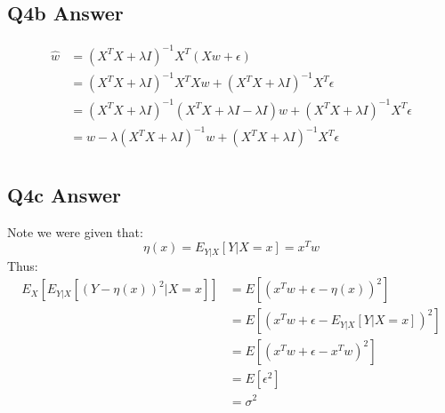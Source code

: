 \documentclass{article}
\newcommand{\1}{\mathbf{1}}
\begin{document}
\subsection{Q4b Answer}

\begin{align}
    \hat{w} & = (X^TX + \lambda I)^{-1}X^T(Xw + \epsilon) \\
            & = (X^TX + \lambda I)^{-1}X^TXw + (X^TX + \lambda I)^{-1}X^T \epsilon \\
            & = (X^TX + \lambda I)^{-1}(X^TX + \lambda I - \lambda I)w + (X^TX + \lambda I)^{-1}X^T \epsilon \\
            & = w - \lambda(X^TX + \lambda I)^{-1}w + (X^TX + \lambda I)^{-1}X^T \epsilon \\
\end{align}



\subsection{Q4c Answer}
Note we were given that:
$$\eta(x) = E_{Y|X}[Y|X=x] = x^Tw$$
Thus:
\begin{align}
    E_X[E_{Y|X}[(Y-\eta(x))^2| X = x]] & = E[(x^T w + \epsilon - \eta(x))^2] \\
    & = E[(x^T w + \epsilon -  E_{Y|X}[Y|X=x])^2 ] \\
    & = E[(x^T w + \epsilon -  x^T w)^2 ] \\
    & = E[\epsilon^2 ] \\
    & = \sigma^2 \\
\end{align}
\end{document}
